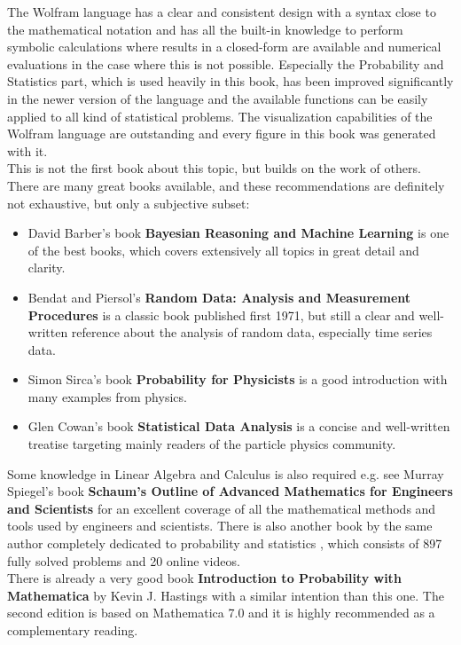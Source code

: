 \documentclass{tstextbook}
\begin{document}
The Wolfram language has a clear and consistent design with a syntax close to the mathematical notation and has all the built-in knowledge to perform symbolic calculations where results in a closed-form are available and numerical evaluations in the case where this is not possible. Especially the Probability and Statistics part, which is used heavily in this book, has been improved significantly in the newer version of the language and the available functions can be easily applied to all kind of statistical problems. The visualization capabilities of the Wolfram language are outstanding and every figure in this book was generated with it.\\

This is not the first book about this topic, but builds on the work of others. There are many great books available, and these recommendations are definitely not exhaustive, but only a subjective subset:

\begin{itemize}
\item 
David Barber's book \textbf{Bayesian Reasoning and Machine Learning} \cite{barber2011} is one of the best books, which covers extensively all topics in great detail and clarity.
\item
Bendat and Piersol's \textbf{Random Data: Analysis and Measurement Procedures} \cite{bendat2010} is a classic book published first 1971, but still a clear and well-written reference about the analysis of random data, especially time series data.
\item
Simon Sirca's book \textbf{Probability for Physicists} \cite{sirca2016} is a good introduction with many examples from physics.
\item
Glen Cowan's book \textbf{Statistical Data Analysis} \cite{cowan1998} is a concise and well-written treatise targeting mainly readers of the particle physics community.   
\end{itemize}

Some knowledge in Linear Algebra and Calculus is also required e.g. see Murray Spiegel's book \textbf{Schaum's Outline of Advanced Mathematics for Engineers and Scientists} \cite{spiegel2009} for an excellent coverage of all the mathematical methods and tools used by engineers and scientists. There is also another book by the same author completely dedicated to probability and statistics \cite{spiegel2012}, which consists of 897 fully solved problems and 20 online videos.\\

There is already a very good book \textbf{Introduction to Probability with Mathematica} by Kevin J. Hastings \cite{hastings2001} with a similar intention than this one. The second edition is based on Mathematica 7.0 and it is highly recommended as a complementary reading.\\
\end{document}
